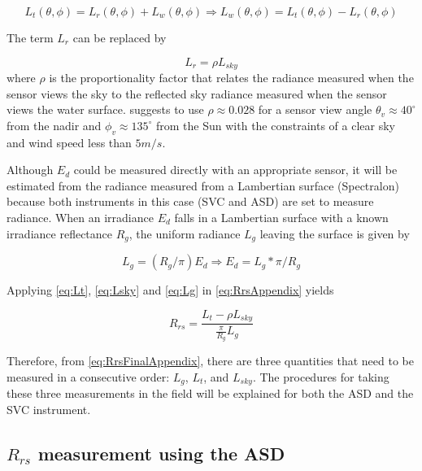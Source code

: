 \begin{appendices}
\begin{equation}\label{eq:Lt}
	L_t(\theta,\phi) = L_r(\theta,\phi)+L_w(\theta,\phi)\Rightarrow L_w(\theta,\phi)=L_t(\theta,\phi) - L_r(\theta,\phi)
\end{equation}

The term $L_r$ can be replaced by

\begin{equation}\label{eq:Lsky}
	L_r = \rho L_{sky}
\end{equation}
where $\rho$ is the proportionality factor that relates the radiance measured when the sensor views the sky to the reflected sky radiance measured when the sensor views the water surface. \cite{Mobley:1999} suggests to use $\rho \approx 0.028$ for a sensor view angle $\theta_v \approx 40^\circ$ from the nadir and  $\phi_v \approx 135^\circ$ from the Sun with the constraints of a clear sky and wind speed less than $5m/s$.

Although $E_d$ could be measured directly with an appropriate sensor, it will be estimated from the radiance measured from a Lambertian surface (Spectralon) because both instruments in this case (SVC and ASD) are set to measure radiance. When an irradiance $E_d$ falls in a Lambertian surface with a known irradiance reflectance $R_g$, the uniform radiance $L_g$ leaving the surface is given by 

\begin{equation}\label{eq:Lg}
	L_g = (R_g/\pi)E_d\Rightarrow E_d = L_g*\pi/R_g
\end{equation}

Applying \autoref{eq:Lt}, \autoref{eq:Lsky} and \autoref{eq:Lg} in \autoref{eq:RrsAppendix} yields

\begin{equation}\label{eq:RrsFinalAppendix}
	R_{rs} = \frac{L_t-\rho L_{sky}}{\frac{\displaystyle \pi}{\displaystyle R_g}L_g}
\end{equation}

Therefore, from \autoref{eq:RrsFinalAppendix}, there are three quantities that need to be measured in a consecutive order: $L_g$, $L_t$, and $L_{sky}$. The procedures for taking these three measurements in the field will be explained for both the ASD and the SVC instrument.

\subsection{\texorpdfstring{$R_{rs}$}{Rrs} measurement using the ASD}


\end{appendices}
